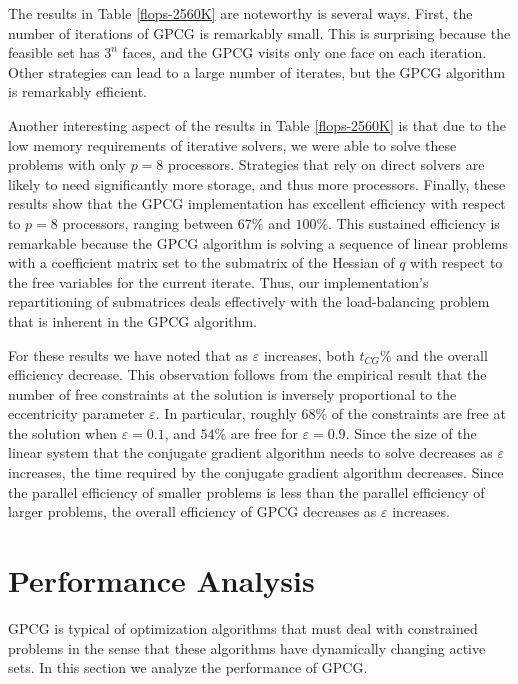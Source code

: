 The results in Table \ref{flops-2560K} are noteworthy is several ways.
First, the number of iterations of GPCG is remarkably small.
This is surprising because the feasible set 
has $ 3^n $ faces, and the
GPCG visits only one face on each iteration.
Other strategies can lead to a large number of 
iterates, but the GPCG algorithm is remarkably efficient.

Another interesting aspect of the results in Table \ref{flops-2560K}
is that due to the
low memory requirements of iterative solvers, we were able
to solve these problems with only $ p = 8 $ processors.
Strategies that rely on direct solvers are likely to need
significantly more storage, and thus more processors.
Finally, these results show that the GPCG implementation has
excellent efficiency with 
respect to $ p = 8 $ processors,
ranging between $ 67\% $ and $ 100\% $.
This sustained efficiency is remarkable because the 
GPCG algorithm is solving a sequence
of linear problems with a
coefficient matrix set to the submatrix of the Hessian of $q$ with 
respect to the
free variables for the current iterate.
Thus, our implementation's repartitioning of submatrices deals effectively
with the load-balancing problem that is inherent
in the GPCG algorithm.

For these results we have noted that as $ \varepsilon $ increases,
both $t_{CG}\%$ and the overall efficiency decrease.
This observation follows from the empirical result
that the number of free constraints
at the solution is inversely proportional to the eccentricity
parameter $ \varepsilon $.
In particular, roughly $ 68 \% $ of the constraints are free at the
solution when $ \varepsilon = 0.1 $, and $ 54\% $ are free for
$ \varepsilon = 0.9 $.
Since the size of the linear system
that the conjugate gradient algorithm needs to solve decreases
as $ \varepsilon $ increases, the time required
by the conjugate gradient algorithm decreases.
Since the parallel efficiency of smaller problems is less than the
parallel efficiency of larger problems, the overall efficiency of GPCG
decreases as  $ \varepsilon $ increases.

\section{Performance Analysis}

\label{sec:analysis}

GPCG is typical of optimization algorithms that
must deal with constrained problems in the sense that these
algorithms have dynamically changing active sets.
In this section we analyze the performance of GPCG.

